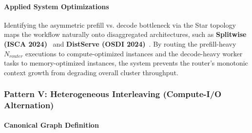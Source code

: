 \paragraph{Applied System Optimizations}
Identifying the asymmetric prefill vs. decode bottleneck via the Star topology maps the workflow naturally onto disaggregated architectures, such as \textbf{Splitwise (ISCA 2024)}~\citep{patel2024splitwise} and \textbf{DistServe (OSDI 2024)}~\citep{zhong2024distserve}. By routing the prefill-heavy $N_{router}$ executions to compute-optimized instances and the decode-heavy worker tasks to memory-optimized instances, the system prevents the router's monotonic context growth from degrading overall cluster throughput.

\subsubsection{Pattern V: Heterogeneous Interleaving (Compute-I/O Alternation)}

\paragraph{Canonical Graph Definition}
\begin{center}
\end{center}

